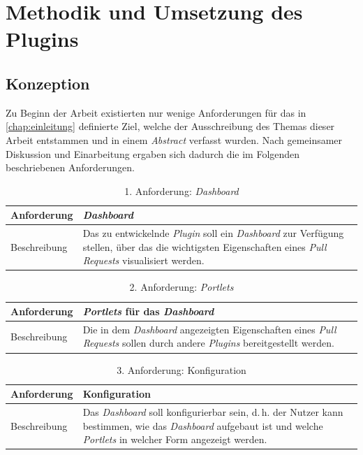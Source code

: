 \chapter{Methodik und Umsetzung des Plugins}
\label{chap:umsetzung}

\section{Konzeption}

Zu Beginn der Arbeit existierten nur wenige Anforderungen für das in \autoref{chap:einleitung} definierte Ziel, welche der Ausschreibung des Themas dieser Arbeit entstammen und in einem \textit{Abstract} \citep{ausschreibung} verfasst wurden. Nach gemeinsamer Diskussion und Einarbeitung ergaben sich dadurch die im Folgenden beschriebenen Anforderungen.

\begin{table}[H]
\begin{tabularx}{\textwidth} { 
  | X | X | }
 \hline
 Anforderung & \textit{Dashboard} \\
 \hline
Beschreibung  & Das zu entwickelnde \textit{Plugin} soll ein \textit{Dashboard} zur Verfügung stellen, über das die wichtigsten Eigenschaften eines \textit{Pull Requests} visualisiert werden. \\
\hline
\end{tabularx}
\caption{1. Anforderung: \textit{Dashboard}}
\end{table}

\begin{table}[H]
\begin{tabularx}{\textwidth} { 
  | X | X | }
 \hline
 Anforderung & \textit{Portlets} für das \textit{Dashboard} \\
 \hline
Beschreibung  & Die in dem \textit{Dashboard} angezeigten Eigenschaften eines \textit{Pull Requests} sollen durch andere \textit{Plugins} bereitgestellt werden. \\
\hline
\end{tabularx}
\caption{2. Anforderung: \textit{Portlets}}
\label{tab:portlets}
\end{table}

\begin{table}[H]
\begin{tabularx}{\textwidth} { 
  | X | X | }
 \hline
 Anforderung & Konfiguration \\
 \hline
Beschreibung  & Das \textit{Dashboard} soll konfigurierbar sein, d.\,h. der Nutzer kann bestimmen, wie das \textit{Dashboard} aufgebaut ist und welche \textit{Portlets} in welcher Form angezeigt werden. \\
\hline
\end{tabularx}
\caption{3. Anforderung: Konfiguration}
\end{table}

